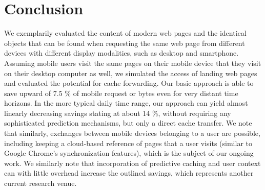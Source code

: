 \documentclass[letterpaper,conference]{IEEEtran}
\begin{document}
\section{Conclusion}
\label{s:conc}
We exemplarily evaluated the content of modern web pages and the identical objects that can be found when requesting the same web page from different devices with different display modalities, such as desktop and smartphone.
Assuming mobile users visit the same pages on their mobile device that they visit on their desktop computer as well, we simulated the access of landing web pages and evaluated the potential for cache forwarding.
Our basic approach is able to save upward of 7.5 \% of mobile request or bytes even for very distant time horizons.
In the more typical daily time range, our approach can yield almost linearly decreasing savings stating at about 14 \%, without requiring any sophisticated prediction mechanisms, but only a direct cache transfer.
We note that similarly, exchanges between mobile devices belonging to a user are possible, including keeping a cloud-based reference of pages that a user visits (similar to Google Chrome's synchronization features), which is the subject of our ongoing work. We similarly note that incorporation of predictive caching and user context can with little overhead increase the outlined savings, which represents another current research venue.



\end{document}
